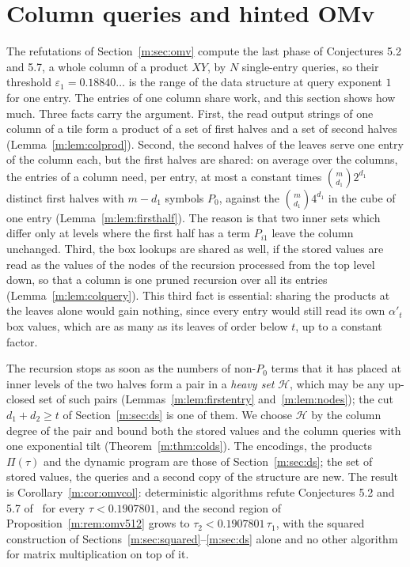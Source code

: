\documentclass[11pt]{article}
\theoremstyle{definition}
\theoremstyle{remark}
\newcommand{\HintedOMvRfourteen}{0.18840}%
\newcommand{\HintedOMvRtwenty}{0.1907801}%
\begin{document}
\section{Column queries and hinted OMv}\label{m:sec:omvcol}

The refutations of Section~\ref{m:sec:omv} compute the last phase of Conjectures 5.2 and 5.7, a whole column of a product $XY$, by $N$ single-entry queries, so their threshold $\varepsilon_1=\HintedOMvRfourteen\ldots$ is the range of the data structure at query exponent $1$ for one entry. The entries of one column share work, and this section shows how much. Three facts carry the argument. First, the read output strings of one column of a tile form a product of a set of first halves and a set of second halves (Lemma~\ref{m:lem:colprod}). Second, the second halves of the leaves serve one entry of the column each, but the first halves are shared: on average over the columns, the entries of a column need, per entry, at most a constant times $\binom m{d_1}2^{d_1}$ distinct first halves with $m-d_1$ symbols $P_0$, against the $\binom m{d_1}4^{d_1}$ in the cube of one entry (Lemma~\ref{m:lem:firsthalf}). The reason is that two inner sets which differ only at levels where the first half has a term $P_{i1}$ leave the column unchanged. Third, the box lookups are shared as well, if the stored values are read as the values of the nodes of the recursion processed from the top level down, so that a column is one pruned recursion over all its entries (Lemma~\ref{m:lem:colquery}). This third fact is essential: sharing the products at the leaves alone would gain nothing, since every entry would still read its own $\alpha'_t$ box values, which are as many as its leaves of order below $t$, up to a constant factor.

The recursion stops as soon as the numbers of non-$P_0$ terms that it has placed at inner levels of the two halves form a pair in a \emph{heavy set} $\mathcal H$, which may be any up-closed set of such pairs (Lemmas~\ref{m:lem:firstentry} and~\ref{m:lem:nodes}); the cut $d_1+d_2\ge t$ of Section~\ref{m:sec:ds} is one of them. We choose $\mathcal H$ by the column degree of the pair and bound both the stored values and the column queries with one exponential tilt (Theorem~\ref{m:thm:colds}). The encodings, the products $\Pi(\tau)$ and the dynamic program are those of Section~\ref{m:sec:ds}; the set of stored values, the queries and a second copy of the structure are new. The result is Corollary~\ref{m:cor:omvcol}: deterministic algorithms refute Conjectures 5.2 and 5.7 of~\cite{BNS19} for every $\tau<\HintedOMvRtwenty$, and the second region of Proposition~\ref{m:rem:omv512} grows to $\tau_2<\HintedOMvRtwenty\,\tau_1$, with the squared construction of Sections~\ref{m:sec:squared}--\ref{m:sec:ds} alone and no other algorithm for matrix multiplication on top of it.
\end{document}
